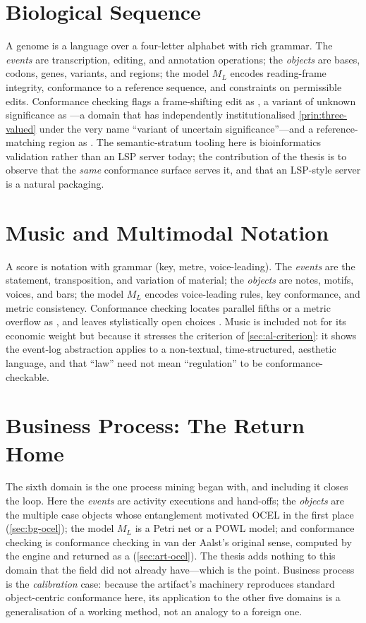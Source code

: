 \section{Biological Sequence}
\label{sec:al-bio}

A genome is a language over a four-letter alphabet with rich grammar. The
\emph{events} are transcription, editing, and annotation operations; the
\emph{objects} are bases, codons, genes, variants, and regions; the model $M_L$
encodes reading-frame integrity, conformance to a reference sequence, and
constraints on permissible edits. Conformance checking flags a frame-shifting
edit as , a variant of unknown significance as \unknownstat---a domain
that has independently institutionalised \cref{prin:three-valued} under the very
name ``variant of uncertain significance''---and a reference-matching region as
\admitted. The semantic-stratum tooling here is bioinformatics validation rather
than an LSP server today; the contribution of the thesis is to observe that the
\emph{same} conformance surface serves it, and that an LSP-style server is a
natural packaging.

\section{Music and Multimodal Notation}
\label{sec:al-music}

A score is notation with grammar (key, metre, voice-leading). The \emph{events}
are the statement, transposition, and variation of material; the \emph{objects}
are notes, motifs, voices, and bars; the model $M_L$ encodes voice-leading rules,
key conformance, and metric consistency. Conformance checking locates parallel
fifths or a metric overflow as , and leaves stylistically open choices
\unknownstat. Music is included not for its economic weight but because it
stresses the criterion of \cref{sec:al-criterion}: it shows the event-log
abstraction applies to a non-textual, time-structured, aesthetic language, and
that ``law'' need not mean ``regulation'' to be conformance-checkable.

\section{Business Process: The Return Home}
\label{sec:al-bpm}

The sixth domain is the one process mining began with, and including it closes the
loop. Here the \emph{events} are activity executions and hand-offs; the
\emph{objects} are the multiple case objects whose entanglement motivated OCEL in
the first place (\cref{sec:bg-ocel}); the model $M_L$ is a Petri net or a POWL
model; and conformance checking is conformance checking in van der Aalst's
original sense, computed by the  engine and returned as a
 (\cref{sec:art-ocel}). The thesis adds nothing to this domain
that the field did not already have---which is the point. Business process is the
\emph{calibration} case: because the artifact's machinery reproduces standard
object-centric conformance here, its application to the other five domains is a
generalisation of a working method, not an analogy to a foreign one.

